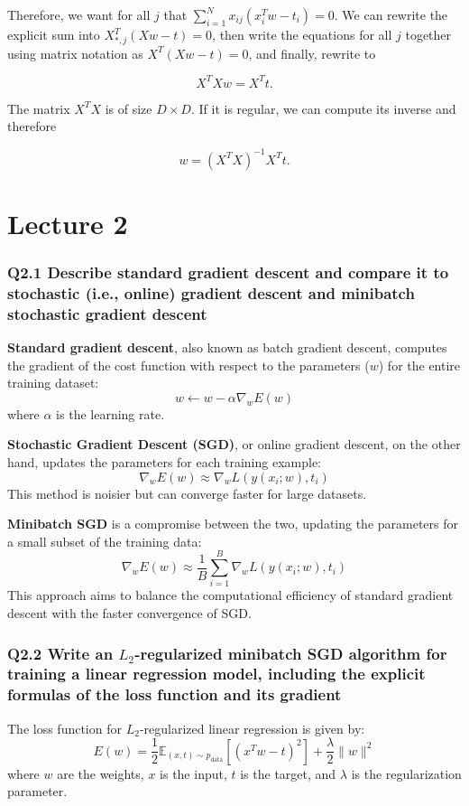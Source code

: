 \documentclass[11pt]{article}
\begin{document}
Therefore, we want for all \( j \) that \( \sum_{i=1}^{N} x_{ij}(x_i^T w - t_i) = 0 \). We can rewrite the explicit sum into \( X_{*,j}^T (Xw - t) = 0 \), then write the equations for all \( j \) together using matrix notation as \( X^T(Xw - t) = 0 \), and finally, rewrite to

\[
X^TXw = X^Tt.
\]

The matrix \( X^TX \) is of size \( D \times D \). If it is regular, we can compute its inverse and therefore

\[
w = (X^TX)^{-1}X^Tt.
\]

\part{Lecture 2}
\section{Q2.1 Describe standard gradient descent and compare it to stochastic (i.e., online) gradient descent and minibatch stochastic gradient descent}

\textbf{Standard gradient descent}, also known as batch gradient descent, computes the gradient of the cost function with respect to the parameters (\( w \)) for the entire training dataset:
\[
w \leftarrow w - \alpha \nabla_w E(w)
\]
where \( \alpha \) is the learning rate.

\textbf{Stochastic Gradient Descent (SGD)}, or online gradient descent, on the other hand, updates the parameters for each training example:
\[
\nabla_w E(w) \approx \nabla_w L(y(x_i; w), t_i)
\]
This method is noisier but can converge faster for large datasets.

\textbf{Minibatch SGD} is a compromise between the two, updating the parameters for a small subset of the training data:
\[
\nabla_w E(w) \approx \frac{1}{B} \sum_{i=1}^{B} \nabla_w L(y(x_i; w), t_i)
\]
This approach aims to balance the computational efficiency of standard gradient descent with the faster convergence of SGD.

\section{Q2.2 Write an \( L_2 \)-regularized minibatch SGD algorithm for training a linear regression model, including the explicit formulas of the loss function and its gradient}
The loss function for \( L_2 \)-regularized linear regression is given by:
\[
E(w) = \frac{1}{2} \mathbb{E}_{(x,t)\sim p_{\text{data}}} [(x^T w - t)^2] + \frac{\lambda}{2} \|w\|^2
\]
where \( w \) are the weights, \( x \) is the input, \( t \) is the target, and \( \lambda \) is the regularization parameter.
\end{document}
